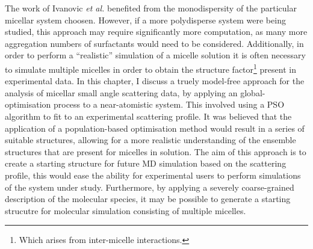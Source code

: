 The work of Ivanovic \emph{et al.} benefited from the monodispersity of the particular micellar system choosen.
However, if a more polydisperse system were being studied, this approach may require significantly more computation, as many more aggregation numbers of surfactants would need to be considered.
Additionally, in order to perform a ``realistic'' simulation of a micelle solution it is often necessary to simulate multiple micelles in order to obtain the structure factor\footnote{Which arises from inter-micelle interactions.} present in experimental data.
In this chapter, I discuss a truely model-free approach for the analysis of micellar small angle scattering data, by applying an global-optimisation process to a near-atomistic system.
This involved using a PSO algorithm to fit to an experimental scattering profile.
It was believed that the application of a population-based optimisation method would result in a series of suitable structures, allowing for a more realistic understanding of the ensemble structures that are present for micelles in solution.
The aim of this approach is to create a starting structure for future MD simulation based on the scattering profile, this would ease the ability for experimental users to perform simulations of the system under study.
Furthermore, by applying a severely coarse-grained description of the molecular species, it may be possible to generate a starting strucutre for molecular simulation consisting of multiple micelles.
